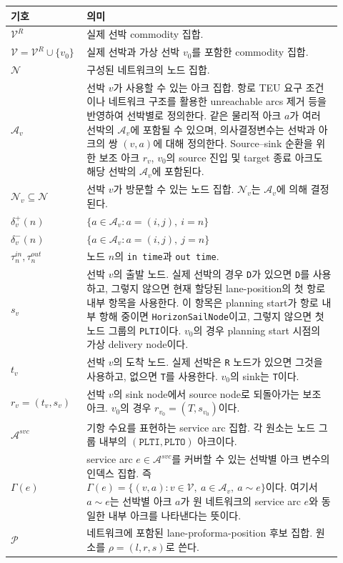 \documentclass[11pt]{article}
\newcommand{\Vessels}{\mathcal{V}}
\newcommand{\RealVessels}{\mathcal{V}^{R}}
\newcommand{\Nodes}{\mathcal{N}}
\newcommand{\Arcs}{\mathcal{A}}
\newcommand{\ServiceArcs}{\mathcal{A}^{svc}}
\newcommand{\Positions}{\mathcal{P}}
\newcommand{\out}{\delta^+}
\newcommand{\inb}{\delta^-}
\begin{document}
\begin{longtable}{@{}p{0.18\linewidth}p{0.74\linewidth}@{}}
\toprule
기호 & 의미 \\
\midrule
\endhead
$\RealVessels$ & 실제 선박 commodity 집합. \\
$\Vessels=\RealVessels\cup\{v_0\}$ & 실제 선박과 가상 선박 $v_0$를 포함한 commodity 집합. \\
$\Nodes$ & 구성된 네트워크의 노드 집합. \\
$\Arcs_v$ & 선박 $v$가 사용할 수 있는 아크 집합. 항로 TEU 요구 조건이나 네트워크 구조를 활용한 unreachable arcs 제거 등을 반영하여 선박별로 정의한다. 같은 물리적 아크 $a$가 여러 선박의 $\Arcs_v$에 포함될 수 있으며, 의사결정변수는 선박과 아크의 쌍 $(v,a)$에 대해 정의한다. Source--sink 순환을 위한 보조 아크 $r_v$, $v_0$의 source 진입 및 target 종료 아크도 해당 선박의 $\Arcs_v$에 포함된다. \\
$\Nodes_v\subseteq\Nodes$ & 선박 $v$가 방문할 수 있는 노드 집합. $\Nodes_v$는 $\Arcs_v$에 의해 결정된다. \\
$\out_v(n)$ & $\{a\in\Arcs_v : a=(i,j),\ i=n\}$ \\
$\inb_v(n)$ & $\{a\in\Arcs_v : a=(i,j),\ j=n\}$ \\
$\tau^{in}_n,\tau^{out}_n$ & 노드 $n$의 \texttt{in time}과 \texttt{out time}. \\
$s_v$ & 선박 $v$의 출발 노드. 실제 선박의 경우 \texttt{D}가 있으면 \texttt{D}를 사용하고, 그렇지 않으면 현재 할당된 lane-position의 첫 항로 내부 항목을 사용한다. 이 항목은 planning start가 항로 내부 항해 중이면 \texttt{HorizonSailNode}이고, 그렇지 않으면 첫 노드 그룹의 \texttt{PLTI}이다. $v_0$의 경우 planning start 시점의 가상 delivery node이다. \\
$t_v$ & 선박 $v$의 도착 노드. 실제 선박은 \texttt{R} 노드가 있으면 그것을 사용하고, 없으면 \texttt{T}를 사용한다. $v_0$의 sink는 \texttt{T}이다. \\
$r_v=(t_v,s_v)$ & 선박 $v$의 sink node에서 source node로 되돌아가는 보조 아크. $v_0$의 경우 $r_{v_0}=(T,s_{v_0})$이다. \\
$\ServiceArcs$ & 기항 수요를 표현하는 service arc 집합. 각 원소는 노드 그룹 내부의 $(\texttt{PLTI},\texttt{PLTO})$ 아크이다. \\
$\Gamma(e)$ & service arc $e\in\ServiceArcs$를 커버할 수 있는 선박별 아크 변수의 인덱스 집합. 즉 $\Gamma(e)=\{(v,a): v\in\Vessels,\ a\in\Arcs_v,\ a\sim e\}$이다. 여기서 $a\sim e$는 선박별 아크 $a$가 원 네트워크의 service arc $e$와 동일한 내부 아크를 나타낸다는 뜻이다. \\
$\Positions$ & 네트워크에 포함된 lane-proforma-position 후보 집합. 원소를 $\rho=(l,r,s)$로 쓴다. \\

\end{longtable}
\end{document}
